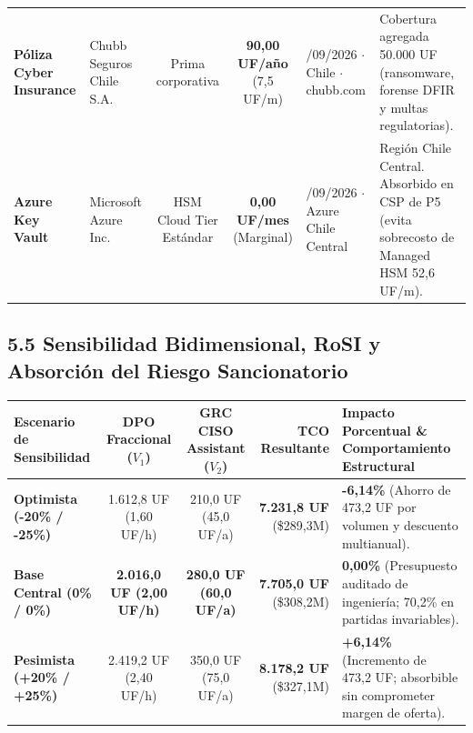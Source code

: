 \documentclass[7.5pt,letterpaper]{article}
\begin{document}
\begin{tabularx}{\textwidth}{@{} >{\raggedright\arraybackslash}p{2.0cm} >{\raggedright\arraybackslash}p{2.0cm} c c >{\raggedright\arraybackslash}p{2.3cm} >{\raggedright\arraybackslash}X @{}}
\textbf{Póliza Cyber Insurance} & Chubb Seguros Chile S.A. & Prima corporativa & \textbf{90,00 UF/año} (7,5 UF/m) & 16/09/2026 $\cdot$ Chile $\cdot$ chubb.com & Cobertura agregada 50.000 UF (ransomware, forense DFIR y multas regulatorias). \\
\rowcolor{RowAltBg}
\textbf{Azure Key Vault} & Microsoft Azure Inc. & HSM Cloud Tier Estándar & \textbf{0,00 UF/mes} (Marginal) & 16/09/2026 $\cdot$ Azure Chile Central & Región Chile Central. Absorbido en CSP de P5 (evita sobrecosto de Managed HSM 52,6 UF/m). \\
\bottomrule
\end{tabularx}

\vspace{-4.5pt}
\subsection*{\scriptsize\color{NavyPrimary}5.5 Sensibilidad Bidimensional, RoSI y Absorción del Riesgo Sancionatorio}
\vspace{-4.5pt}
\fontsize{5.3pt}{6.3pt}\selectfont
\begin{tabularx}{\textwidth}{@{} >{\raggedright\arraybackslash}p{3.7cm} c c r >{\raggedright\arraybackslash}X @{}}
\toprule
\rowcolor{TableHeadBg}
\textbf{Escenario de Sensibilidad} & \textbf{DPO Fraccional ($V_1$)} & \textbf{GRC CISO Assistant ($V_2$)} & \textbf{TCO Resultante} & \textbf{Impacto Porcentual \& Comportamiento Estructural} \\
\midrule
\textbf{Optimista (-20\% / -25\%)} & 1.612,8 UF (1,60 UF/h) & 210,0 UF (45,0 UF/a) & \textbf{7.231,8 UF} (\$289,3M) & \textbf{-6,14\%} (Ahorro de 473,2 UF por volumen y descuento multianual). \\
\rowcolor{RowAltBg}
\textbf{Base Central (0\% / 0\%)} & \textbf{2.016,0 UF (2,00 UF/h)} & \textbf{280,0 UF (60,0 UF/a)} & \textbf{7.705,0 UF} (\$308,2M) & \textbf{0,00\%} (Presupuesto auditado de ingeniería; 70,2\% en partidas invariables). \\
\textbf{Pesimista (+20\% / +25\%)} & 2.419,2 UF (2,40 UF/h) & 350,0 UF (75,0 UF/a) & \textbf{8.178,2 UF} (\$327,1M) & \textbf{+6,14\%} (Incremento de 473,2 UF; absorbible sin comprometer margen de oferta). \\
\bottomrule
\end{tabularx}
\end{document}
